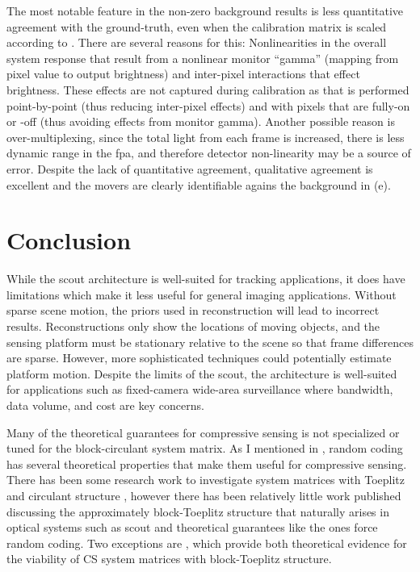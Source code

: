 The most notable feature in the non-zero background results is less quantitative agreement with the ground-truth, even when the calibration matrix is scaled according to . There are several reasons for this: Nonlinearities in the overall system response that result from a nonlinear monitor “gamma” (mapping from pixel value to output brightness) and inter-pixel interactions that effect brightness. These effects are not captured during calibration as that is performed point-by-point (thus reducing inter-pixel effects) and with pixels that are fully-on or -off (thus avoiding effects from monitor gamma). Another possible reason is over-multiplexing, since the total light from each frame is increased, there is less dynamic range in the \gls{fpa}, and therefore detector non-linearity may be a source of error. Despite the lack of quantitative agreement, qualitative agreement is excellent and the movers are clearly identifiable agains the background in (e).



\section{Conclusion}

While the \gls{scout} architecture is well-suited for tracking applications, it does have limitations which make it less useful for general imaging applications. Without sparse scene motion, the priors used in reconstruction will lead to incorrect results. Reconstructions only show the locations of moving objects, and the sensing platform must be stationary relative to the scene so that frame differences are sparse. However, more sophisticated techniques could potentially estimate platform motion. Despite the limits of the \gls{scout}, the architecture is well-suited for applications such as fixed-camera wide-area surveillance where bandwidth, data volume, and cost are key concerns.

Many of the theoretical guarantees for \gls{compressive sensing} is not specialized or tuned for the block-circulant system matrix. As I mentioned in , random coding has several theoretical properties that make them useful for compressive sensing. There has been some research work to investigate system matrices with Toeplitz and circulant structure \cite{bajwa2007toeplitz, rauhut2009circulant, romberg2009compressive}, however there has been relatively little work published discussing the approximately block-Toeplitz structure that naturally arises in optical systems such as \gls{scout} and theoretical guarantees like the ones force random coding. Two exceptions are \cite{sebert2008toeplitz, liu2008sparsesense}, which provide both theoretical evidence for the viability of CS system matrices with block-Toeplitz structure.



